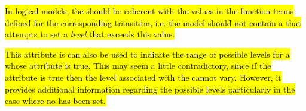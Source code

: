 \hl{In logical models, the  should be coherent with the  values in the function terms defined for the corresponding transition, i.e. the model should not contain a \FunctionTerm that attempts to set a \emph{level} that exceeds this value.}

\hl{This attribute is can also be used to indicate the range of possible levels for a \QualitativeSpecies whose  attribute is true. This may seem a little contradictory, since if the  attribute is true then the level associated with the \QualitativeSpecies cannot vary. However, it provides additional information regarding the possible levels particularly in the case where no  has been set.}

%
%
%
%
%
%

